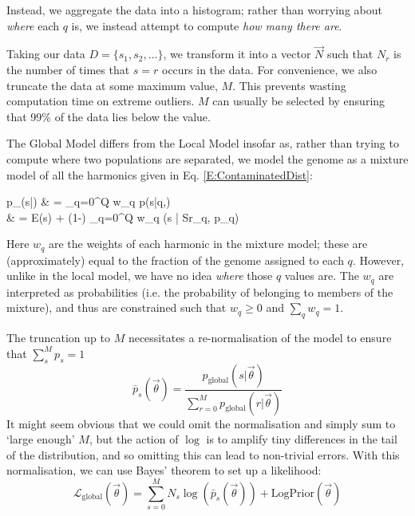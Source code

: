 \documentclass[fleqn,usenatbib]{mnras}
\newcommand{\eref}[1]{Eq. \eqref{#1}}
\begin{document}
{{					Instead, we aggregate the data into a histogram; rather than worrying about \textit{where} each $q$ is, we instead attempt to compute \textit{how many there are}.

					Taking our data $D = \{s_1, s_2, ...\}$, we transform it into a vector $\vec{N}$ such that $N_r$ is the number of times that $s = r$ occurs in the data. For convenience, we also truncate the data at some maximum value, $M$. This prevents wasting computation time on extreme outliers. $M$ can usually be selected by ensuring that 99\% of the data lies below the value.

					The Global Model differs from the Local Model insofar as, rather than trying to compute where two populations are separated, we model the genome as a mixture model of all the harmonics given in \eref{E:ContaminatedDist}:
					\begin{spalign}
						p_(s|\vec{\theta}) & = \sum_{q=0}^Q w_q p(s|q,\vec{\theta}) 
						\\
						& = \epsilon E(s) + (1-\epsilon) \sum_{q=0}^Q w_q (s | Sr_q, p_q) \label{E:DefinePGlobal}
					\end{spalign}
					Here $w_q$ are the weights of each harmonic in the mixture model; these are (approximately) equal to the fraction of the genome assigned to each $q$. However, unlike in the local model, we have no idea \textit{where} those $q$ values are. The $w_q$ are interpreted as probabilities (i.e. the probability of belonging to members of the mixture), and thus are constrained such that $w_q \geq 0$ and $\sum_q w_q = 1$.

					The truncation up to $M$ necessitates a re-normalisation of the model to ensure that $\sum_s^M p_s = 1$
					\begin{equation}
						\bar{p}_s(\vec{\theta}) = \frac{p_\text{global}(s|\vec{\theta})}{\sum_{r=0}^M p_\text{global}(r|\vec{\theta})}
					\end{equation}
					It might seem obvious that we could omit the normalisation and simply sum to `large enough' $M$, but the action of $\log$ is to amplify tiny differences in the tail of the distribution, and so omitting this can lead to non-trivial errors. With this normalisation, we can use Bayes' theorem to set up a likelihood:
					\begin{equation}
						\mathcal{L}_\text{global}(\vec{\theta}) = \sum_{s=0}^M N_s \log\left(\bar{p}_s(\vec{\theta})\right) + \text{LogPrior}(\vec{\theta})
					\end{equation}
					
}}
\end{document}
